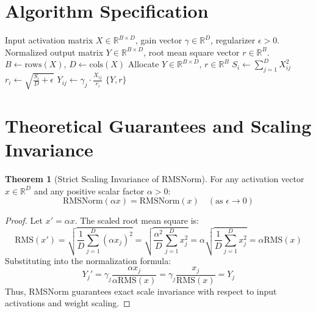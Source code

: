 \documentclass[11pt,a4paper]{article}
\theoremstyle{definition}
\newtheorem{theorem}{Theorem}[section]
\begin{document}
\section{Algorithm Specification}

\begin{algorithm}[H]
\caption{RMSNorm Forward Transformation}
\label{alg:rms_norm}
\begin{algorithmic}[1]
\Require Input activation matrix $X \in \mathbb{R}^{B \times D}$, gain vector $\gamma \in \mathbb{R}^D$, regularizer $\epsilon > 0$.
\Ensure Normalized output matrix $Y \in \mathbb{R}^{B \times D}$, root mean square vector $r \in \mathbb{R}^B$.
\State $B \gets \text{rows}(X)$, $D \gets \text{cols}(X)$
\State Allocate $Y \in \mathbb{R}^{B \times D}$, $r \in \mathbb{R}^B$
    \State $S_i \gets \sum_{j=1}^D X_{ij}^2$
    \State $r_i \gets \sqrt{\frac{S_i}{D} + \epsilon}$
        \State $Y_{ij} \gets \gamma_j \cdot \frac{X_{ij}}{r_i}$
    \EndFor
\EndFor
\State \Return $\{Y, r\}$
\end{algorithmic}
\end{algorithm}

\section{Theoretical Guarantees and Scaling Invariance}

\begin{theorem}[Strict Scaling Invariance of RMSNorm]
For any activation vector $x \in \mathbb{R}^D$ and any positive scalar factor $\alpha > 0$:
\begin{equation}
\text{RMSNorm}(\alpha x) = \text{RMSNorm}(x) \quad (\text{as } \epsilon \to 0)
\end{equation}
\end{theorem}

\begin{proof}
Let $x' = \alpha x$. The scaled root mean square is:
\begin{equation}
\text{RMS}(x') = \sqrt{\frac{1}{D}\sum_{j=1}^D (\alpha x_j)^2} = \sqrt{\frac{\alpha^2}{D}\sum_{j=1}^D x_j^2} = \alpha \sqrt{\frac{1}{D}\sum_{j=1}^D x_j^2} = \alpha \text{RMS}(x)
\end{equation}
Substituting into the normalization formula:
\begin{equation}
Y_j' = \gamma_j \frac{\alpha x_j}{\alpha \text{RMS}(x)} = \gamma_j \frac{x_j}{\text{RMS}(x)} = Y_j
\end{equation}
Thus, RMSNorm guarantees exact scale invariance with respect to input activations and weight scaling.
\end{proof}
\end{document}
